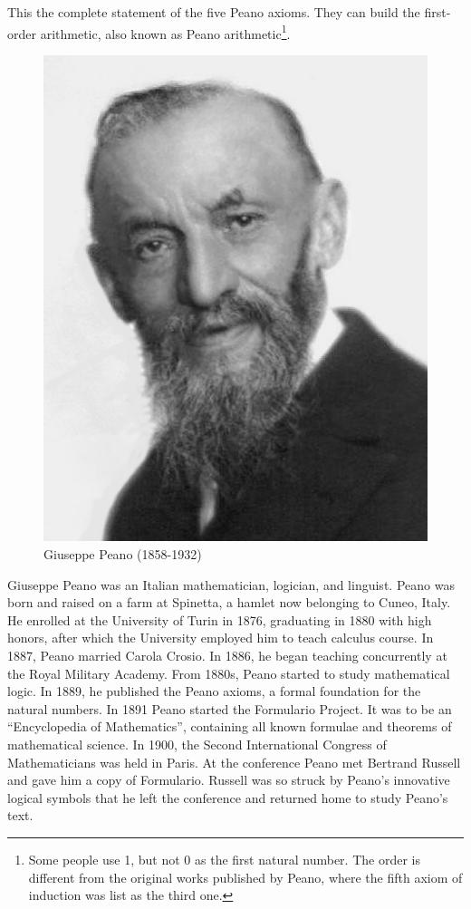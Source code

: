 \documentclass[UTF8]{article}
\begin{document}
This the complete statement of the five Peano axioms. They can build the first-order arithmetic, also known as Peano arithmetic\footnote{Some people use 1, but not 0 as the first natural number. The order is different from the original works published by Peano, where the fifth axiom of induction was list as the third one.}.

\begin{figure}[htbp]
 \centering
 \includegraphics[scale=0.2]{img/Peano.jpg}
 \caption{Giuseppe Peano (1858-1932)}
 \label{fig:Peano}
\end{figure}

Giuseppe Peano was an Italian mathematician, logician, and linguist. Peano was born and raised on a farm at Spinetta, a hamlet now belonging to Cuneo, Italy. He enrolled at the University of Turin in 1876, graduating in 1880 with high honors, after which the University employed him to teach calculus course. In 1887, Peano married Carola Crosio. In 1886, he began teaching concurrently at the Royal Military Academy. From 1880s, Peano started to study mathematical logic. In 1889, he published the Peano axioms, a formal foundation for the natural numbers. In 1891 Peano started the Formulario Project. It was to be an ``Encyclopedia of Mathematics'', containing all known formulae and theorems of mathematical science. In 1900, the Second International Congress of Mathematicians was held in Paris. At the conference Peano met Bertrand Russell and gave him a copy of Formulario. Russell was so struck by Peano's innovative logical symbols that he left the conference and returned home to study Peano's text\cite{M-Kline-2007}.
\end{document}
